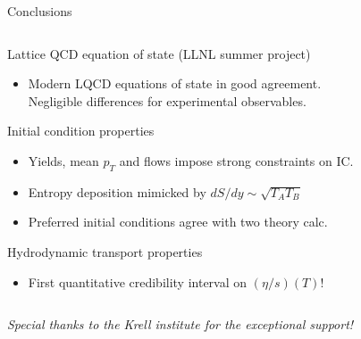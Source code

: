 \documentclass[xcolor=dvipsnames, aspectratio=169]{beamer}
\begin{document}
\begin{frame}[plain]{Conclusions}
    \medskip
    \begin{columns}
    \begin{column}{0.85\textwidth}
        Lattice QCD equation of state (LLNL summer project)
        \begin{itemize}
            \item Modern LQCD equations of state in good agreement.\\ Negligible differences for experimental observables. 
        \end{itemize}
        \smallskip
        Initial condition properties
        \begin{itemize}
            \item Yields, mean $p_T$ and flows impose strong constraints on IC. \\
            \item Entropy  deposition mimicked by $dS/dy \sim \sqrt{T_A T_B}$ \\
            \item Preferred initial conditions agree with two theory calc. \\
        \end{itemize}
        \smallskip
        Hydrodynamic transport properties
        \begin{itemize}
            \item First quantitative credibility interval on $(\eta/s)(T)$!
        \end{itemize}
    \end{column}
    \end{columns}
\end{frame}


\begin{frame}[plain]
    \centering
    \emph{Special thanks to the Krell institute for the exceptional support!}
\end{frame}

\appendix
\end{document}
